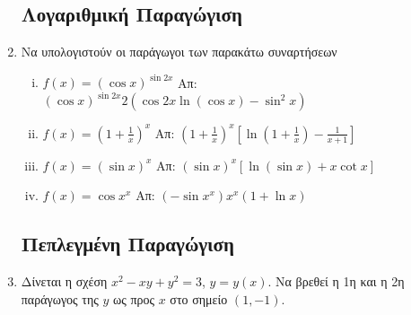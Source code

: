 \begin{enumerate}
    \subsection*{Λογαριθμική Παραγώγιση}

  \item  Να υπολογιστούν οι παράγωγοι των παρακάτω συναρτήσεων

    \begin{enumerate}[(i)]
      \item $ f(x) = (\cos{x})^{\sin{2x}} $ \hfill Απ: $
        (\cos{x})^{\sin{2x}} 2(\cos{2x} \ln{(\cos{x})} - \sin^{2}{x}) $
      \item $ f(x) = \left(1 + \frac{1}{x} \right)^{x} $ \hfill Απ: $
        \left(1 + \frac{1}{x}\right)^{x}\left[\ln{(1 + \frac{1}{x})} -
        \frac{1}{x+1}\right] $
      \item $ f(x)=(\sin{x})^{x} $ \hfill Απ: $ (\sin{x})^{x}[\ln{(\sin{x}
        )} + x \cot{x}] $ 
      \item $ f(x)=\cos{x}^{x} $ \hfill Απ: $ (- \sin{x^{x}})x^{x} (1 +
        \ln{x}) $
    \end{enumerate}


    \subsection*{Πεπλεγμένη Παραγώγιση}

    \item Δίνεται η σχέση $ x^{2} - xy + y^{2} = 3 $, $ y=y(x) $. Να βρεθεί η 1η
      και η 2η παράγωγος της $y$ ως προς $x$ στο σημείο $ (1,-1) $.


\end{enumerate}
